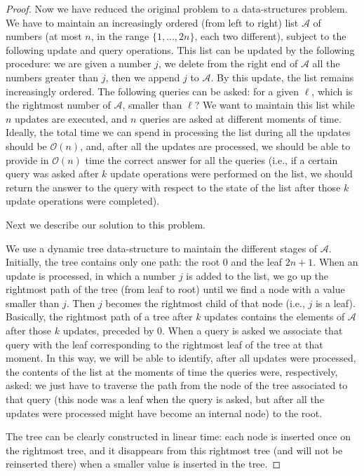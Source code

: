 \documentclass[final]{dmtcs-episciences}
\newcommand{\bigo}{{\mathcal O}}
\begin{document}
\begin{proof}
Now we have reduced the original problem to a data-structures problem. We have to maintain an increasingly ordered (from left to right) list ${\mathcal A}$ of numbers (at most $n$, in the range $\{1,\ldots,2n\}$, each two different), subject to the following update and query operations. This list can be updated by the following procedure: we are given a number $j$, we delete from the right end of ${\mathcal A}$ all the numbers greater than $j$, then we append $j$ to ${\mathcal A}$. By this update, the list remains increasingly ordered.  The following queries can be asked: for a given $\ell$, which is the rightmost number of ${\mathcal A}$, smaller than $\ell$? 
We want to maintain this list while $n$ updates are executed, and $n$ queries are asked at different moments of time. 
Ideally, the total time we can spend in processing the list during all the updates should be $\bigo(n)$, and, after all the updates are processed, we should be able to provide in $\bigo(n)$ time the correct answer for all the queries (i.e., if a certain query was asked after $k$ update operations were performed on the list, we should return the answer to the query with respect to the state of the list after those $k$ update operations were completed).

Next we describe our solution to this problem.

We use a dynamic tree data-structure to maintain the different stages of ${\mathcal A}$. Initially, the tree contains only one path: the root $0$ and the leaf $2n+1$. When an update is processed, in which a number $j$ is added to the list, we go up the rightmost path of the tree (from leaf to root) until we find a node with a value smaller than $j$. Then $j$ becomes the rightmost child of that node (i.e., $j$ is a leaf). Basically, the rightmost path of a tree after $k$ updates contains the elements of ${\mathcal A}$ after those $k$ updates, preceded by $0$. When a query is asked we associate that query with the leaf corresponding to the rightmost leaf of the tree at that moment. In this way, we will be able to identify, after all updates were processed, the contents of the list at the moments of time the queries were, respectively, asked: we just have to traverse the path from the node of the tree associated to that query (this node was a leaf when the query is asked, but after all the updates were processed might have become an internal node) to the root.

The tree can be clearly constructed in linear time: each node is inserted once on the rightmost tree, and it disappears from this rightmost tree (and will not be reinserted there) when a smaller value is inserted in the tree.


\end{proof}
\end{document}
